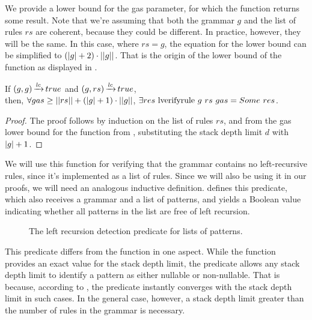 We provide a lower bound for the gas parameter,
for which the function returns some result.
Note that we're assuming that both the grammar $g$
and the list of rules $rs$ are coherent,
because they could be different.
In practice, however,
they will be the same.
In this case,
where $rs = g$,
the equation for the lower bound can be simplified
to $(|g| + 2) \cdot ||g||$.
That is the origin of the lower bound of the
\textit{\verifygrammarname{}} function
as displayed in .

\begin{lemma}%
    If $(g,g) \operatorname{\xrightarrow{\mathit{lc}}} true$ and $(g,rs) \operatorname{\xrightarrow{\mathit{lc}}} true$, \\
    then, $\forall gas \ge ||rs|| + (|g| + 1) \cdot ||g||$,
    $\exists res\ \lverifyrulecomp{g}{rs}{gas} = \Some res$.
\end{lemma}

\begin{proof}
    The proof follows by induction on the list of rules $rs$,
    and from the gas lower bound for the function \textit{\verifyrulename{}}
    from ,
    substituting the stack depth limit $d$ with $|g|+1$.
\end{proof}

We will use this function for
verifying that the grammar contains
no left-recursive rules,
since it's implemented as a list of rules.
Since we will also be using it in our proofs,
we will need an analogous inductive definition.
 defines this predicate,
which also receives a grammar and a list of patterns,
and yields a Boolean value indicating
whether all patterns in the list are free of left recursion.

\begin{figure}
    \centering
    
    \caption{The left recursion detection predicate for lists of patterns.}
    \label{fig:lverifyrule}
\end{figure}

This predicate differs from the function in one aspect.
While the function provides an exact value for the
stack depth limit, the predicate allows any stack depth limit
to identify a pattern as either nullable or non-nullable.
That is because, according to ,
the predicate instantly converges with the stack depth limit in such cases.
In the general case, however,
a stack depth limit greater than
the number of rules in the grammar
is necessary.

